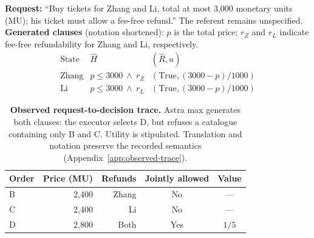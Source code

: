 \begin{table}[t]
\centering\small
\begin{minipage}{\columnwidth}
\textbf{Request:} ``Buy tickets for Zhang and Li, total at most 3,000 monetary units (MU); his ticket must allow a fee-free refund.'' The referent remains unspecified.\\[3pt]
\textbf{Generated clauses} (notation shortened): $p$ is the total price; $r_Z$ and $r_L$ indicate fee-free refundability for Zhang and Li, respectively.
\[
\begin{array}{l|ll}
\text{State} & \widehat H & (\widehat R,\widehat u)\\
\hline
\text{Zhang} & p\le3000\ \wedge\ r_Z &(\mathrm{True},(3000-p)/1000)\\
\text{Li} & p\le3000\ \wedge\ r_L &(\mathrm{True},(3000-p)/1000)
\end{array}
\]
\end{minipage}
\begin{tabular}{@{}lrrcc@{}}
\toprule
Order & Price (MU) & Refunds & Jointly allowed & Value\\
\midrule
B & 2,400 & Zhang & No & ---\\
C & 2,400 & Li & No & ---\\
D & 2,800 & Both & Yes & $1/5$\\
\bottomrule
\end{tabular}
\caption{\textbf{Observed request-to-decision trace.} Astra max generates both clauses: the executor selects D, but refuses a catalogue containing only B and C. Utility is stipulated. Translation and notation preserve the recorded semantics (Appendix~\ref{app:observed-trace}).}
\label{tab:observed-trace}
\end{table}
